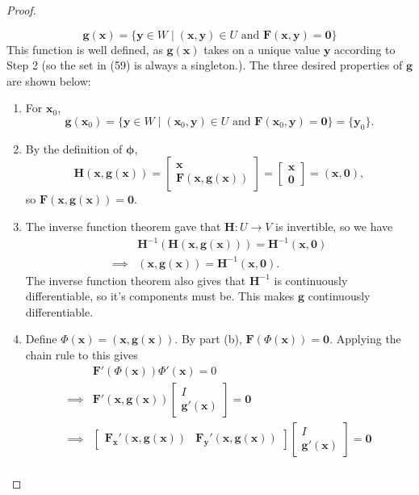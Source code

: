 \documentclass{article}
\newcommand{\x}{\mathbf{x}}
\newcommand{\F}{\mathbf{F}}
\newcommand{\y}{\mathbf{y}}
\newcommand{\g}{\mathbf{g}}
\newcommand{\ze}{\mathbf{0}}
\theoremstyle{definition}
\begin{document}
\begin{proof}
\begin{enumerate}
			\begin{equation}\label{key}
				\g(\x)= \{\y\in W \mid (\x,\y)\in U \text{ and }\F(\x,\y)=\ze \}
			\end{equation} This function is well defined, as $ \g(\x) $ takes on a unique value $ \y $ according to Step 2 (so the set in (59) is always a singleton.). The three desired properties of $ \g $ are shown below:
			\begin{enumerate}
				\item For $ \x_0 $, 
				$$ \g(\x_0) = \{\y\in W \mid (\x_0,\y)\in U \text{ and }\F(\x_0,\y)=\ze \} = \{\y_0\} .$$
				\item By the definition of $ \boldsymbol{\phi} $, 
				$$ \mathbf H(\x,\g(\x)) = \begin{bmatrix}
					\x \\ \F(\x, \g(\x))
				\end{bmatrix} = \begin{bmatrix}
					\x \\ \ze
				\end{bmatrix} = (\x, \ze),$$ so $ \F(\x, \g(\x))=\ze $.
				\item The inverse function theorem gave that $ \mathbf H:U\to V $ is invertible, so we have 
				\begin{align*}
					&\mathbf H^{-1}\left( \mathbf H(\x,\g(\x)) \right)  = \mathbf H^{-1}(\x,\ze)\\ \implies 
					& (\x,\g(\x)) = \mathbf H^{-1}(\x,\ze).
				\end{align*}  
				The inverse function theorem also gives that $ \mathbf H^{-1} $ is continuously differentiable, so it's components must be. This makes $ \g $ continuously differentiable. 
				\item Define $\Phi(\x) = (\x,\g(\x)) $. By part (b), $ \F(\Phi(\x))=\ze $. Applying the chain rule to this gives 
				\begin{align*}
					&		\F'(\Phi(\x))\Phi'(\x)=0\\
					\implies & 	\F'(\x, \g(\x))\begin{bmatrix}
						I \\ \g'(\x)
					\end{bmatrix} = \ze\\
					\implies & 	\begin{bmatrix}
						\F_\x'(\x,\g(\x)) & 	\F_\y'(\x,\g(\x))
					\end{bmatrix}\begin{bmatrix}
						I \\ \g'(\x)
					\end{bmatrix} = \ze\\ 

\end{align*}
\end{enumerate}
\end{enumerate}
\end{proof}
\end{document}
